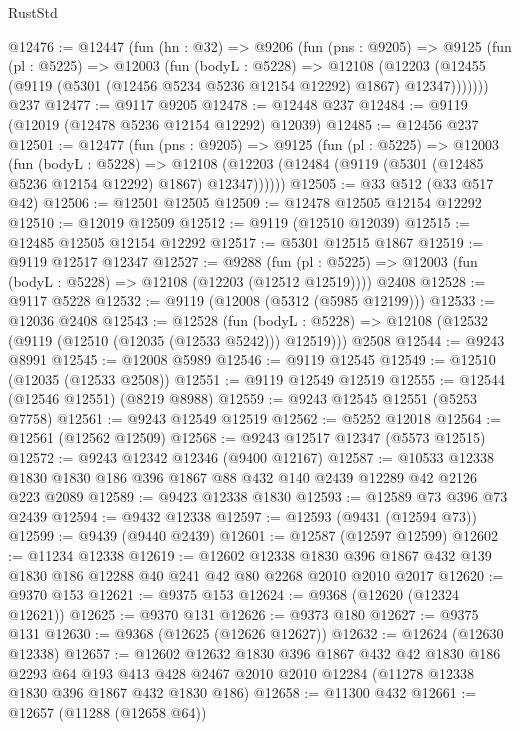 \begin{lexlean}{RustStd}
\begin{coremodule}
@12476 := @12447
    (fun (hn : @32) =>
    @9206
      (fun (pns : @9205) =>
      @9125
        (fun (pl : @5225) =>
        @12003
          (fun (bodyL : @5228) =>
          @12108
            (@12203 (@12455 (@9119 (@5301 (@12456 @5234 @5236 @12154 @12292) @1867) @12347)))))))
    @237
@12477 := @9117 @9205
@12478 := @12448 @237
@12484 := @9119 (@12019 (@12478 @5236 @12154 @12292) @12039)
@12485 := @12456 @237
@12501 := @12477
    (fun (pns : @9205) =>
    @9125
      (fun (pl : @5225) =>
      @12003
        (fun (bodyL : @5228) =>
        @12108 (@12203 (@12484 (@9119 (@5301 (@12485 @5236 @12154 @12292) @1867) @12347))))))
@12505 := @33 @512 (@33 @517 @42)
@12506 := @12501 @12505
@12509 := @12478 @12505 @12154 @12292
@12510 := @12019 @12509
@12512 := @9119 (@12510 @12039)
@12515 := @12485 @12505 @12154 @12292
@12517 := @5301 @12515 @1867
@12519 := @9119 @12517 @12347
@12527 := @9288
    (fun (pl : @5225) => @12003 (fun (bodyL : @5228) => @12108 (@12203 (@12512 @12519))))
    @2408
@12528 := @9117 @5228
@12532 := @9119 (@12008 (@5312 (@5985 @12199)))
@12533 := @12036 @2408
@12543 := @12528
    (fun (bodyL : @5228) => @12108 (@12532 (@9119 (@12510 (@12035 (@12533 @5242))) @12519)))
    @2508
@12544 := @9243 @8991
@12545 := @12008 @5989
@12546 := @9119 @12545
@12549 := @12510 (@12035 (@12533 @2508))
@12551 := @9119 @12549 @12519
@12555 := @12544 (@12546 @12551) (@8219 @8988)
@12559 := @9243 @12545 @12551 (@5253 @7758)
@12561 := @9243 @12549 @12519
@12562 := @5252 @12018
@12564 := @12561 (@12562 @12509)
@12568 := @9243 @12517 @12347 (@5573 @12515)
@12572 := @9243 @12342 @12346 (@9400 @12167)
@12587 := @10533 @12338 @1830 @1830 @186 @396 @1867 @88 @432 @140 @2439 @12289 @42 @2126 @223 @2089
@12589 := @9423 @12338 @1830
@12593 := @12589 @73 @396 @73 @2439
@12594 := @9432 @12338
@12597 := @12593 (@9431 (@12594 @73))
@12599 := @9439 (@9440 @2439)
@12601 := @12587 (@12597 @12599)
@12602 := @11234 @12338
@12619 := @12602
    @12338
    @1830
    @396
    @1867
    @432
    @139
    @1830
    @186
    @12288
    @40
    @241
    @42
    @80
    @2268
    @2010
    @2010
    @2017
@12620 := @9370 @153
@12621 := @9375 @153
@12624 := @9368 (@12620 (@12324 @12621))
@12625 := @9370 @131
@12626 := @9373 @180
@12627 := @9375 @131
@12630 := @9368 (@12625 (@12626 @12627))
@12632 := @12624 (@12630 @12338)
@12657 := @12602
    @12632
    @1830
    @396
    @1867
    @432
    @42
    @1830
    @186
    @2293
    @64
    @193
    @413
    @428
    @2467
    @2010
    @2010
    @12284
    (@11278 @12338 @1830 @396 @1867 @432 @1830 @186)
@12658 := @11300 @432
@12661 := @12657 (@11288 (@12658 @64))

\end{coremodule}
\end{lexlean}
